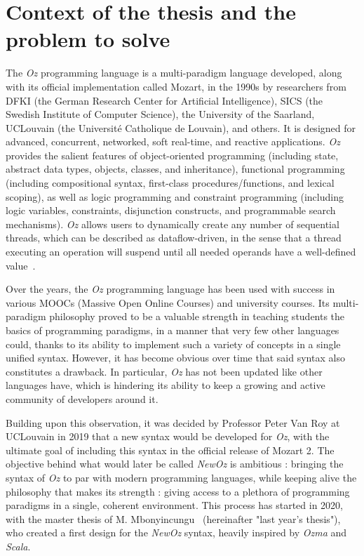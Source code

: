 
\section{Context of the thesis and the problem to solve}\label{sec:ch1-context}
The \textit{Oz} programming language is a multi-paradigm language developed, along with its official implementation called Mozart, in the 1990s by researchers from DFKI (the German Research Center for Artificial Intelligence), SICS (the Swedish Institute of Computer Science), the University of the Saarland, UCLouvain (the Université Catholique de Louvain), and others.
It is designed for advanced, concurrent, networked, soft real-time, and reactive applications.
\textit{Oz} provides the salient features of object-oriented programming (including state, abstract data types, objects, classes, and inheritance),
functional programming (including compositional syntax, first-class procedures/functions, and lexical scoping), as well as
logic programming and constraint programming (including logic variables, constraints, disjunction constructs, and programmable search mechanisms).
\textit{Oz} allows users to dynamically create any number of sequential threads, which can be described as dataflow-driven, in the sense that a thread executing an operation will suspend until all needed operands have a well-defined value~\cite{mozart2tutorial}.\newline

Over the years, the \textit{Oz} programming language has been used with success in various MOOCs (Massive Open Online Courses) and university courses.
Its multi-paradigm philosophy proved to be a valuable strength in teaching students the basics of programming paradigms, in a manner that very few other languages could, thanks to its ability to implement such a variety of concepts in a single unified syntax.
However, it has become obvious over time that said syntax also constitutes a drawback.
In particular, \textit{Oz} has not been updated like other languages have, which is hindering its ability to keep a growing and active community of developers around it.\newline

Building upon this observation, it was decided by Professor Peter Van Roy at UCLouvain in 2019 that a new syntax would be developed for \textit{Oz}, with the ultimate goal of including this syntax in the official release of Mozart 2.
The objective behind what would later be called \textit{NewOz} is ambitious : bringing the syntax of \textit{Oz} to par with modern programming languages, while keeping alive the philosophy that makes its strength : giving access to a plethora of programming paradigms in a single, coherent environment.
This process has started in 2020, with the master thesis of M. Mbonyincungu~\cite{jpthesis} (hereinafter "last year's thesis"), who created a first design for the \textit{NewOz} syntax, heavily inspired by \textit{Ozma} and \textit{Scala}.\newline

